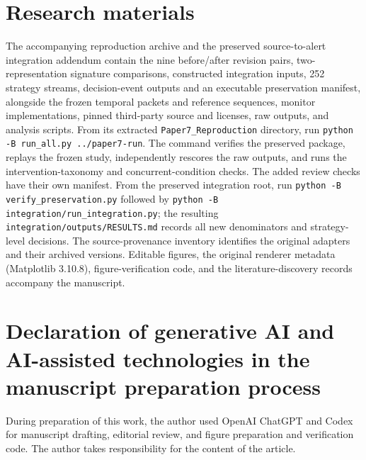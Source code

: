 \documentclass[preprint,11pt]{elsarticle}
\newcommand{\code}[1]{\texttt{#1}}
\begin{document}
\section*{Research materials}
The accompanying reproduction archive and the preserved source-to-alert integration addendum contain the nine before/after revision pairs, two-representation signature comparisons, constructed integration inputs, 252 strategy streams, decision-event outputs and an executable preservation manifest, alongside the frozen temporal packets and reference sequences, monitor implementations, pinned third-party source and licenses, raw outputs, and analysis scripts. From its extracted \code{Paper7\_Reproduction} directory, run \code{python -B run\_all.py ../paper7-run}. The command verifies the preserved package, replays the frozen study, independently rescores the raw outputs, and runs the intervention-taxonomy and concurrent-condition checks. The added review checks have their own manifest. From the preserved integration root, run \code{python -B verify\_preservation.py} followed by \code{python -B integration/run\_integration.py}; the resulting \code{integration/outputs/RESULTS.md} records all new denominators and strategy-level decisions. The source-provenance inventory identifies the original adapters and their archived versions. Editable figures, the original renderer metadata (Matplotlib 3.10.8), figure-verification code, and the literature-discovery records accompany the manuscript.

\section*{Declaration of generative AI and AI-assisted technologies in the manuscript preparation process}
During preparation of this work, the author used OpenAI ChatGPT and Codex for manuscript drafting, editorial review, and figure preparation and verification code. The author takes responsibility for the content of the article.

\renewcommand{\bibfont}{\small}


\end{document}
